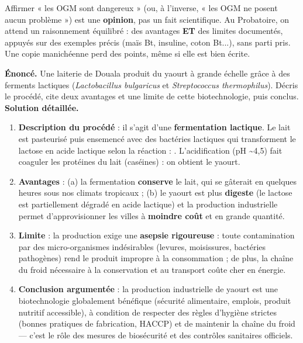 \documentclass[11pt]{article}
\begin{document}
\begin{attention}[Erreur fréquente : « OGM = dangereux »]
Affirmer « les OGM sont dangereux » (ou, à l'inverse, « les OGM ne posent aucun problème ») est une \textbf{opinion}, pas un fait scientifique. Au Probatoire, on attend un raisonnement équilibré : des avantages \textbf{ET} des limites documentés, appuyés sur des exemples précis (maïs Bt, insuline, coton Bt...), sans parti pris. Une copie manichéenne perd des points, même si elle est bien écrite.
\end{attention}

\begin{exoresolu}
\textbf{Énoncé.} Une laiterie de Douala produit du yaourt à grande échelle grâce à des ferments lactiques (\emph{Lactobacillus bulgaricus} et \emph{Streptococcus thermophilus}). Décris le procédé, cite deux avantages et une limite de cette biotechnologie, puis conclus.
\tcblower
\textbf{Solution détaillée.}
\begin{enumerate}
\item \textbf{Description du procédé} : il s'agit d'une \textbf{fermentation lactique}. Le lait est pasteurisé puis ensemencé avec des bactéries lactiques qui transforment le lactose en acide lactique selon la réaction : . L'acidification (pH \textasciitilde 4,5) fait coaguler les protéines du lait (caséines) : on obtient le yaourt.
\item \textbf{Avantages} : (a) la fermentation \textbf{conserve} le lait, qui se gâterait en quelques heures sous nos climats tropicaux ; (b) le yaourt est plus \textbf{digeste} (le lactose est partiellement dégradé en acide lactique) et la production industrielle permet d'approvisionner les villes à \textbf{moindre coût} et en grande quantité.
\item \textbf{Limite} : la production exige une \textbf{asepsie rigoureuse} : toute contamination par des micro-organismes indésirables (levures, moisissures, bactéries pathogènes) rend le produit impropre à la consommation ; de plus, la chaîne du froid nécessaire à la conservation et au transport coûte cher en énergie.
\item \textbf{Conclusion argumentée} : la production industrielle de yaourt est une biotechnologie globalement bénéfique (sécurité alimentaire, emplois, produit nutritif accessible), à condition de respecter des règles d'hygiène strictes (bonnes pratiques de fabrication, HACCP) et de maintenir la chaîne du froid — c'est le rôle des mesures de biosécurité et des contrôles sanitaires officiels.
\end{enumerate}
\end{exoresolu}
\end{document}
